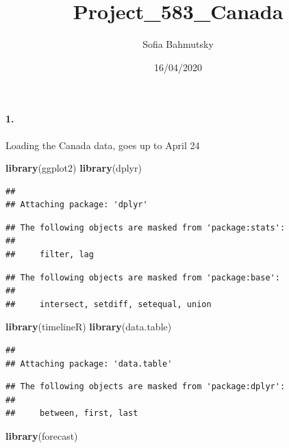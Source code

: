 \documentclass[]{article}
\title{Project\_583\_Canada}
\author{Sofia Bahmutsky}
\date{16/04/2020}
\newenvironment{Shaded}{\begin{snugshade}}{\end{snugshade}}
\newcommand{\KeywordTok}[1]{\textcolor[rgb]{0.13,0.29,0.53}{\textbf{#1}}}
\newcommand{\NormalTok}[1]{#1}
\let\oldparagraph\paragraph
\renewcommand{\paragraph}[1]{\oldparagraph{#1}\mbox{}}
\begin{document}
\maketitle

\hypertarget{section}{%
\paragraph{1.}\label{section}}

Loading the Canada data, goes up to April 24

\begin{Shaded}
\begin{Highlighting}[]
\KeywordTok{library}\NormalTok{(ggplot2)}
\KeywordTok{library}\NormalTok{(dplyr)}
\end{Highlighting}
\end{Shaded}

\begin{verbatim}
## 
## Attaching package: 'dplyr'
\end{verbatim}

\begin{verbatim}
## The following objects are masked from 'package:stats':
## 
##     filter, lag
\end{verbatim}

\begin{verbatim}
## The following objects are masked from 'package:base':
## 
##     intersect, setdiff, setequal, union
\end{verbatim}

\begin{Shaded}
\begin{Highlighting}[]
\KeywordTok{library}\NormalTok{(timelineR)}
\KeywordTok{library}\NormalTok{(data.table)}
\end{Highlighting}
\end{Shaded}

\begin{verbatim}
## 
## Attaching package: 'data.table'
\end{verbatim}

\begin{verbatim}
## The following objects are masked from 'package:dplyr':
## 
##     between, first, last
\end{verbatim}

\begin{Shaded}
\begin{Highlighting}[]
\KeywordTok{library}\NormalTok{(forecast)}
\end{Highlighting}
\end{Shaded}
\end{document}
